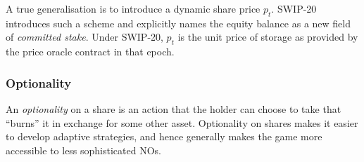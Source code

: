 A true generalisation is to introduce a dynamic share price $p_t$.
%
SWIP-20 introduces such a scheme and explicitly names the equity balance as a new field of \emph{committed stake}.
%
Under SWIP-20, $p_t$ is the unit price of storage as provided by the price oracle contract in that epoch.

\subsubsection*{Optionality}

An \emph{optionality} on a share is an action that the holder can choose to take that ``burns'' it in exchange for some other asset.
%
Optionality on shares makes it easier to develop adaptive strategies, and hence generally makes the game more accessible to less sophisticated NOs.

